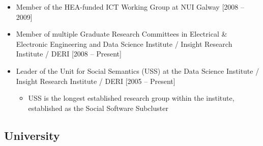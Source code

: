 \documentclass[10pt,a4paper]{res} %
\begin{document}
\begin{resume}
\begin{itemize}
\item Member of the HEA-funded ICT Working Group at NUI Galway [2008 -- 2009]
\item Member of multiple Graduate Research Committees in Electrical \& Electronic Engineering and Data Science Institute / Insight Research Institute / DERI [2008 -- Present]
\item Leader of the Unit for Social Semantics (USS) at the Data Science Institute / Insight Research Institute / DERI [2005 -- Present]
\begin{itemize} \itemsep -2pt
\item USS is the longest established research group within the institute, established as the Social Software Subcluster
\end{itemize}
\end{itemize}

\subsection*{University}


\end{resume}
\end{document}

